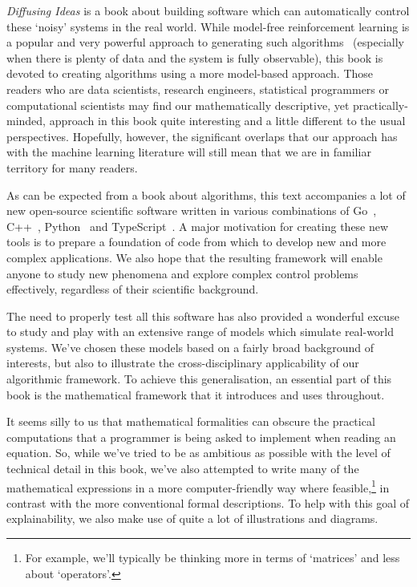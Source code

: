\documentclass{book}
\begin{document}
\emph{Diffusing Ideas} is a book about building software which can automatically control these `noisy' systems in the real world. While model-free reinforcement learning is a popular and very powerful approach to generating such algorithms~\cite{sutton2018reinforcement} (especially when there is plenty of data and the system is fully observable), this book is devoted to creating algorithms using a more model-based approach. Those readers who are data scientists, research engineers, statistical programmers or computational scientists may find our mathematically descriptive, yet practically-minded, approach in this book quite interesting and a little different to the usual perspectives. Hopefully, however, the significant overlaps that our approach has with the machine learning literature will still mean that we are in familiar territory for many readers.

As can be expected from a book about algorithms, this text accompanies a lot of new open-source scientific software written in various combinations of Go~\cite{golang}, C++~\cite{c++lang}, Python~\cite{pythonlang} and TypeScript~\cite{typescriptlang}. A major motivation for creating these new tools is to prepare a foundation of code from which to develop new and more complex applications. We also hope that the resulting framework will enable anyone to study new phenomena and explore complex control problems effectively, regardless of their scientific background.

The need to properly test all this software has also provided a wonderful excuse to study and play with an extensive range of models which simulate real-world systems. We've chosen these models based on a fairly broad background of interests, but also to illustrate the cross-disciplinary applicability of our algorithmic framework. To achieve this generalisation, an essential part of this book is the mathematical framework that it introduces and uses throughout.

It seems silly to us that mathematical formalities can obscure the practical computations that a programmer is being asked to implement when reading an equation. So, while we've tried to be as ambitious as possible with the level of technical detail in this book, we've also attempted to write many of the mathematical expressions in a more computer-friendly way where feasible,\footnote{For example, we'll typically be thinking more in terms of `matrices' and less about `operators'.} in contrast with the more conventional formal descriptions. To help with this goal of explainability, we also make use of quite a lot of illustrations and diagrams.
\end{document}
